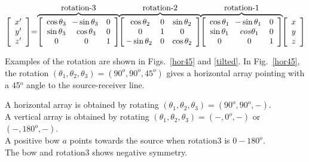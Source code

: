 \documentclass{saclantc}
\begin{document}
\begin{equation}
\left[ \begin{array}{c} x' \\ y' \\z' \end{array}\right]
\hspace{-1mm}= \hspace{-1mm} 
\overbrace{
\left[ \begin{array}{ccc} \cos \theta_3 & \hspace{-1mm} -\sin \theta_3 &0\\
 \sin \theta_3 & \cos \theta_3 & 0\\
0 &0 & 1 \end{array}\right	]
}^{\mbox{rotation-3}}
\hspace{-1mm}
\overbrace{
\left[ \begin{array}{ccc} 
\cos \theta_2 &0 & \sin \theta_2\\
          0   &1 & 0\\
\hspace{-1mm} -\sin \theta_2& 0& \cos \theta_2 \end{array}\right	]
}^{\mbox{rotation-2}}
\hspace{-1mm}
\overbrace{
\left[ \begin{array}{ccc} \cos \theta_1 & \hspace{-1mm} -\sin \theta_1 & 0\\
 \sin \theta_1 & cos \theta_1 & 0\\
0 & 0 & 1 \end{array}\right	]
}^{\mbox{rotation-1}}
\hspace{-1mm} \left[ \begin{array}{c}	 x \\ y \\z \end{array}\right]
\end{equation}

Examples of the rotation are shown in Figs.\ \ref{hor45} and
\ref{tilted}.
In Fig.\ \ref{hor45}, the rotation $(\theta_1, \theta_2,
\theta_3 ) = (90^o, 90^o , 45^o)$ gives a horizontal array pointing
with a 45$^o$ angle to the source-receiver line.

A horizontal array is obtained by rotating $(\theta_1, \theta_2,
\theta_3 ) = (90^o, 90^o , -)$.\\
A vertical array is obtained by   rotating  $(\theta_1, \theta_2,
\theta_3 ) = (-, 0^o , -)$ or $(-, 180^o , -)$.\\
A positive bow $a$ points towards the
source when rotation3 is $0-180^o$. \\
The bow and rotation3 shows
negative symmetry.
\end{document}
